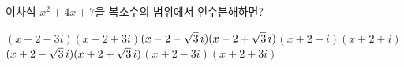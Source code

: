 이차식 $x^2+4x+7$을 복소수의 범위에서 인수분해하면?
\begin{choicesv}{$(x-2-3i)(x-2+3i)$}{$(x-2-\sqrt{3}\mkern3mu i)(x-2+\sqrt{3}\mkern3mu i)$}{$(x+2-i)(x+2+i)$}{$(x+2-\sqrt{3}\mkern3mu i)(x+2+\sqrt{3}\mkern3mu i)$}{$(x+2-3i)(x+2+3i)$}\end{choicesv}
